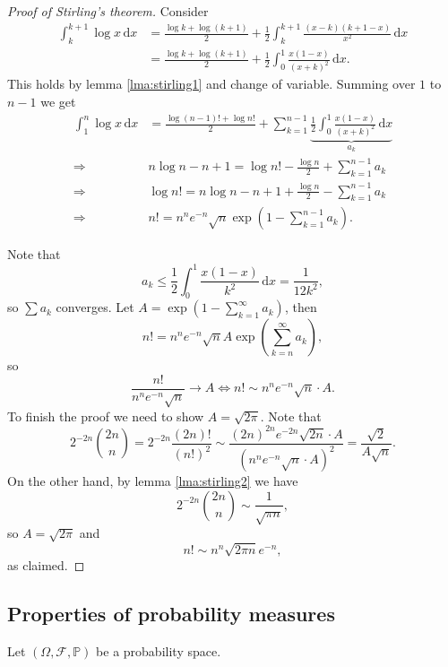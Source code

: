 \begin{proof}[Proof of Stirling's theorem]
    Consider 
    \begin{align*}
        \int_{k}^{k+1} \log x \,\mathrm{d}x &= \frac{\log k+ \log (k+1)}{2} + \frac{1}{2} \int_{k}^{k+1} \frac{(x-k)(k+1-x)}{x^2} \,\mathrm{d}x\\ 
        &= \frac{\log k+ \log (k+1)}{2} + \frac{1}{2} \int_{0}^{1} \frac{x(1-x)}{(x+k)^2} \,\mathrm{d}x.
    \end{align*}
    This holds by lemma \ref{lma:stirling1} and change of variable. Summing over $1$ to $n-1$ we get 
    \begin{align*}
        \int_{1}^{n} \log x \,\mathrm{d}x &= \frac{\log(n-1)!+\log n!}{2} + \sum_{k=1}^{n-1}\underbrace{\frac{1}{2}\int_{0}^{1} \frac{x(1-x)}{(x+k)^2} \,\mathrm{d}x}_{a_k}\\ 
        \Longrightarrow &n\log n-n+1 = \log n! - \frac{\log n}{2} + \sum_{k=1}^{n-1}a_k\\ 
        \Longrightarrow & \log n! = n\log n-n+1+\frac{\log n}{2}-\sum_{k=1}^{n-1}a_k\\ 
        \Longrightarrow & n! = n^n e^{-n} \sqrt{n} \exp\left( 1- \sum_{k=1}^{n-1}a_k\right).
    \end{align*}

    Note that 
    \[
        a_k\le \frac{1}{2}\int_{0}^{1} \frac{x(1-x)}{k^2} \,\mathrm{d}x = \frac{1}{12k^2},
    \]
    so $ \sum a_k$ converges. Let $ A = \exp\left( 1- \sum_{k=1}^{\infty}a_k\right) $, then 
    \[
        n! = n^n e^{-n} \sqrt{n} A \exp \left( \sum_{k=n}^{\infty}a_k \right),
    \]
    so 
    \[
        \frac{n!}{n^n e^{-n} \sqrt{n}} \to A \Longleftrightarrow n! \sim n^n e^{-n} \sqrt{n}\cdot A.
    \]
    To finish the proof we need to show $ A=\sqrt{2\pi} $. Note that 
    \[
        2^{-2n}\binom{2n}{n} = 2^{-2n}\frac{(2n)!}{(n!)^2}\sim \frac{(2n)^{2n} e^{-2n} \sqrt{2n}\cdot A}{(n^n e^{-n} \sqrt{n}\cdot A)^2} = \frac{\sqrt{2}}{A\sqrt{n}}.
    \]
    On the other hand, by lemma \ref{lma:stirling2} we have 
    \[
        2^{-2n}\binom{2n}{n}\sim \frac{1}{\sqrt{\pi n}},
    \]
    so $ A=\sqrt{2\pi} $ and
    \[
        n! \sim n^n \sqrt{2\pi n}e^{-n},
    \]
    as claimed.
\end{proof}

\subsection{Properties of probability measures}

Let $ (\Omega,\mathscr{F},\mathbb{P}) $ be a probability space.

